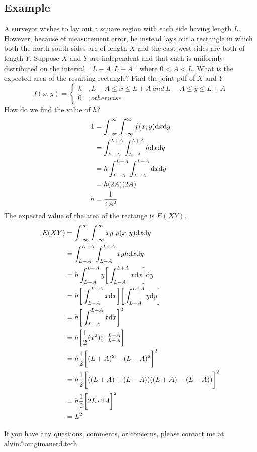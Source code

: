 \documentclass[letterpaper, 12pt]{math}
\begin{document}
\subsection*{Example}
A surveyor wishes to lay out a square region with each side having length
\( L \). However, because of measurement error, he instead lays out a
rectangle in which both the north-south sides are of length \( X \) and
the east-west sides are both of length \( Y \). Suppose \( X \) and \( Y \)
are independent and that each is uniformly distributed on the interval
\( [L-A,L+A] \) where \( 0<A<L \). What is the expected area of the
resulting rectangle? Find the joint pdf of \( X \) and \( Y \).
\[ f(x,y) = \begin{cases}
  h &, L-A\leq x\leq L+A\ and\ L-A\leq y\leq L+A \\
  0 &, otherwise
\end{cases} \]
How do we find the value of \( h \)?
\begin{align*}
  1 &= \int_{-\infty}^{\infty}\int_{-\infty}^{\infty}f(x,y)\mathrm{d}{x}\mathrm{d}{y} \\
  &= \int_{L-A}^{L+A}\int_{L-A}^{L+A}h\mathrm{d}{x}\mathrm{d}{y} \\
  &= h\int_{L-A}^{L+A}\int_{L-A}^{L+A}\mathrm{d}{x}\mathrm{d}{y} \\
  &= h(2A)(2A) \\
  h &= \frac{1}{4A^{2}}
\end{align*}
The expected value of the area of the rectange is \( E(XY) \).
\begin{align*}
  E(XY) &= \int_{-\infty}^{\infty}\int_{-\infty}^{\infty}
    xy\ p(x,y)\mathrm{d}{x}\mathrm{d}{y} \\
  &= \int_{L-A}^{L+A}\int_{L-A}^{L+A}xyh\mathrm{d}{x}\mathrm{d}{y} \\
  &= h\int_{L-A}^{L+A}y\bigg[\int_{L-A}^{L+A}x\mathrm{d}{x}\bigg]\mathrm{d}{y} \\
  &= h\bigg[\int_{L-A}^{L+A}x\mathrm{d}{x}\bigg]
    \bigg[\int_{L-A}^{L+A}y\mathrm{d}{y}\bigg] \\
  &= h\bigg[\int_{L-A}^{L+A}x\mathrm{d}{x}\bigg]^{2} \\
  &= h\bigg[\frac{1}{2}(x^{2})_{x=L-A}^{x=L+A}\bigg] \\
  &= h\frac{1}{2}\bigg[(L+A)^{2}-(L-A)^{2}\bigg]^{2} \\
  &= h\frac{1}{2}\bigg[((L+A)+(L-A))((L+A)-(L-A))\bigg]^{2} \\
  &= h\frac{1}{2}\bigg[2L\cdot2A\bigg]^{2} \\
  &= L^{2}
\end{align*}

\begin{center}
  If you have any questions, comments, or concerns, please contact me at
  alvin@omgimanerd.tech
\end{center}
\end{document}
